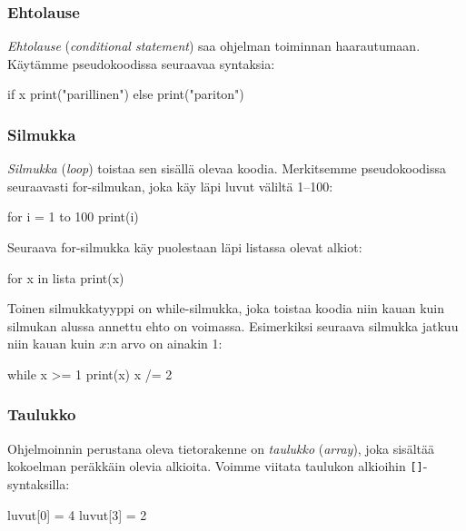 \subsubsection{Ehtolause}

\emph{Ehtolause} (\emph{conditional statement}) saa ohjelman
toiminnan haarautumaan.
Käytämme pseudokoodissa seuraavaa syntaksia:

\begin{code}
if x%
    print("parillinen")
else
    print("pariton")
\end{code}

\subsubsection{Silmukka}

\emph{Silmukka} (\emph{loop}) toistaa sen sisällä olevaa koodia.
Merkitsemme pseudokoodissa seuraavasti for-silmukan,
joka käy läpi luvut väliltä 1--100:

\begin{code}
for i = 1 to 100
    print(i)
\end{code}

Seuraava for-silmukka käy puolestaan läpi listassa olevat alkiot:

\begin{code}
for x in lista
    print(x)
\end{code}

Toinen silmukkatyyppi on while-silmukka, joka toistaa koodia niin kauan
kuin silmukan alussa annettu ehto on voimassa.
Esimerkiksi seuraava silmukka jatkuu niin kauan kuin $x$:n arvo on ainakin 1:

\begin{code}
while x >= 1
    print(x)
    x /= 2
\end{code}

\subsubsection{Taulukko}


Ohjelmoinnin perustana oleva tietorakenne on \emph{taulukko} (\emph{array}),
joka sisältää kokoelman peräkkäin olevia alkioita.
Voimme viitata taulukon alkioihin \texttt{[]}-syntaksilla:

\begin{code}
luvut[0] = 4
luvut[3] = 2
\end{code}


